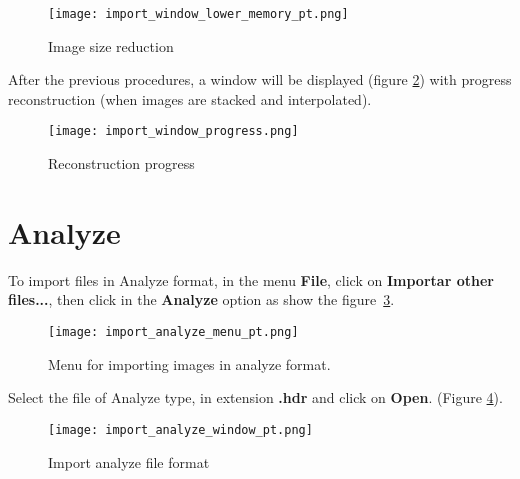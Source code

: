 \begin{figure}[!htb]
\centering
\texttt{[image: import\_window\_lower\_memory\_pt.png]}
\caption{Image size reduction}
\label{fig:resize_image}
\end{figure}


After the previous procedures, a window will be displayed (figure \ref{fig:prog_recons}) with progress reconstruction (when images are stacked and interpolated).

\begin{figure}[!htb]
\centering
\texttt{[image: import\_window\_progress.png]} 
\caption{Reconstruction progress}
\label{fig:prog_recons}
\end{figure}

\newpage

\section{Analyze}


To import files in Analyze format, in the menu \textbf{File}, click on \textbf{Importar other files...}, then click in the \textbf{Analyze} option as show the figure~\ref{fig:analyze_menu}.

\begin{figure}[!htb]
\centering
\texttt{[image: import\_analyze\_menu\_pt.png]}
\caption{Menu for importing images in analyze format.}
\label{fig:analyze_menu}
\end{figure}


Select the file of Analyze type, in extension \textbf{.hdr} and click on \textbf{Open}. (Figure \ref{fig:analyze_import}).
 
\begin{figure}[!htb]
\centering
\texttt{[image: import\_analyze\_window\_pt.png]}
\caption{Import analyze file format}
\label{fig:analyze_import}
\end{figure}

